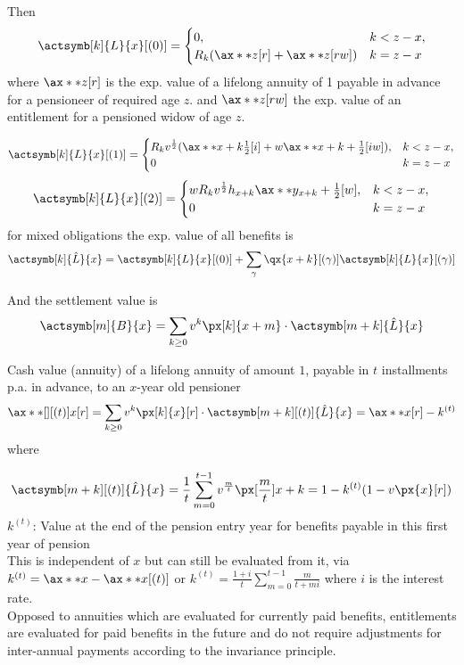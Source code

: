 \documentclass[11pt,a4paper,twoside]{article}
\begin{document}
Then 
\[
  \actsymb[k]{L}{x}[(0)] = \begin{cases}
    0, & k < z - x, \\
    R_k(\ax**{z}[r] + \ax**{z}[rw]) & k = z - x
  \end{cases}
\]
where \( \ax**{z}[r] \) is the exp. value of a lifelong annuity of 1 payable in advance for a pensioneer of required age \(z\).
and \(\ax**{z}[rw] \) the exp. value of an entitlement for a pensioned widow of age \(z\). 

\[
  \actsymb[k]{L}{x}[(1)] = \begin{cases}
    R_k v^{\frac{1}{2}}(\ax**{x + k \frac{1}{2}}[i] + w \ax**{x + k + \frac{1}{2}}[iw]), & k < z - x, \\
    0 & k = z - x
  \end{cases}
\]
\[
  \actsymb[k]{L}{x}[(2)] = \begin{cases}
    w R_k v^{\frac{1}{2}} h_{x+k} \ax**{y_{x + k} + \frac{1}{2}}[w], & k < z - x, \\
    0 & k = z - x
  \end{cases}
\]
for mixed obligations the exp. value of all benefits is
\[ \actsymb[k]{\hat{L}}{x} =  \actsymb[k]{L}{x}[(0)] + \sum_\gamma \qx{x+k}[(\gamma)]\actsymb[k]{L}{x}[(\gamma)] \]

And the settlement value is
\[ \actsymb[m]{B}{x} = \sum_{k\geq 0} v^k \px[k]{x+m} \cdot \actsymb[m + k]{\hat{L}}{x} \]


Cash value (annuity) of a lifelong annuity of amount \(1\), payable in \(t\) installments p.a. in advance, to an \(x\)-year old
pensioner
\[\ax**[][(t)]{x}[r] = \sum_{k\geq 0} v^k \px[k]{x}[r] \cdot \actsymb[m + k][(t)]{\hat{L}}{x} = \ax**{x}[r] - k^{(t)} \]
where 

\[\actsymb[m + k][(t)]{\hat{L}}{x} = \frac{1}{t} \sum_{m = 0}^{t-1} v^{\frac{m}{t}} \px[\frac{m}{t}]{x+k} =  1 - k^{(t)}(1 - v \px{x}[r]) \]
\(k^{(t)}\): Value at the end of the pension entry year for benefits payable in this first year of pension \\
This is independent of \(x\) but can still be evaluated from it, via  
\(k^{(t)} = \ax**{x} - \ax**{x}[(t)]\) or \(k^{(t)} = \frac{1 + i}{t} \sum_{m = 0}^{t-1} \frac{m}{t + m i} \) where \( i \) is the interest rate. \\

Opposed to annuities which are evaluated for currently paid benefits, entitlements are evaluated for paid benefits in the future and 
do not require adjustments for inter-annual payments according to the invariance principle.
\end{document}
